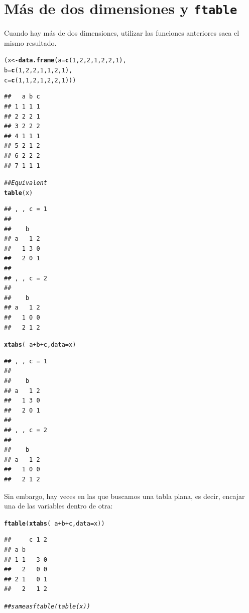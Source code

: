 \documentclass{config/apuntes}\usepackage[]{graphicx}\usepackage[]{xcolor}
\makeatletter
\newcommand{\hlnum}[1]{\textcolor[rgb]{0.686,0.059,0.569}{#1}}%
\newcommand{\hlcom}[1]{\textcolor[rgb]{0.678,0.584,0.686}{\textit{#1}}}%
\newcommand{\hlopt}[1]{\textcolor[rgb]{0,0,0}{#1}}%
\newcommand{\hldef}[1]{\textcolor[rgb]{0.345,0.345,0.345}{#1}}%
\newcommand{\hlkwb}[1]{\textcolor[rgb]{0.69,0.353,0.396}{#1}}%
\newcommand{\hlkwc}[1]{\textcolor[rgb]{0.333,0.667,0.333}{#1}}%
\newcommand{\hlkwd}[1]{\textcolor[rgb]{0.737,0.353,0.396}{\textbf{#1}}}%
\newenvironment{kframe}{%
 \def\at@end@of@kframe{}%
 \ifinner\ifhmode%
  \def\at@end@of@kframe{\end{minipage}}%
  \begin{minipage}{\columnwidth}%
 \fi\fi%
 \def\FrameCommand##1{\hskip\@totalleftmargin \hskip-\fboxsep
 \colorbox{shadecolor}{##1}\hskip-\fboxsep
     \hskip-\linewidth \hskip-\@totalleftmargin \hskip\columnwidth}%
 \MakeFramed {\advance\hsize-\width
   \@totalleftmargin\z@ \linewidth\hsize
   \@setminipage}}%
 {\par\unskip\endMakeFramed%
 \at@end@of@kframe}
\newenvironment{knitrout}{}{} %
\newcommand{\code}[1]{\texttt{#1}}
\makeatother
\begin{document}
\section{Más de dos dimensiones y \code{ftable}}
Cuando hay más de dos dimensiones, utilizar las funciones anteriores saca el mismo resultado. 
\begin{knitrout}
\color{fgcolor}\begin{kframe}
\begin{alltt}
\hldef{(x} \hlkwb{<-}  \hlkwd{data.frame}\hldef{(}\hlkwc{a} \hldef{=} \hlkwd{c}\hldef{(}\hlnum{1}\hldef{,}\hlnum{2}\hldef{,}\hlnum{2}\hldef{,}\hlnum{1}\hldef{,}\hlnum{2}\hldef{,}\hlnum{2}\hldef{,}\hlnum{1}\hldef{),}
                 \hlkwc{b} \hldef{=} \hlkwd{c}\hldef{(}\hlnum{1}\hldef{,}\hlnum{2}\hldef{,}\hlnum{2}\hldef{,}\hlnum{1}\hldef{,}\hlnum{1}\hldef{,}\hlnum{2}\hldef{,}\hlnum{1}\hldef{),}
                 \hlkwc{c} \hldef{=} \hlkwd{c}\hldef{(}\hlnum{1}\hldef{,}\hlnum{1}\hldef{,}\hlnum{2}\hldef{,}\hlnum{1}\hldef{,}\hlnum{2}\hldef{,}\hlnum{2}\hldef{,}\hlnum{1}\hldef{)))}
\end{alltt}
\begin{verbatim}
##   a b c
## 1 1 1 1
## 2 2 2 1
## 3 2 2 2
## 4 1 1 1
## 5 2 1 2
## 6 2 2 2
## 7 1 1 1
\end{verbatim}
\begin{alltt}
\hlcom{## Equivalent}
\hlkwd{table}\hldef{(x)}
\end{alltt}
\begin{verbatim}
## , , c = 1
## 
##    b
## a   1 2
##   1 3 0
##   2 0 1
## 
## , , c = 2
## 
##    b
## a   1 2
##   1 0 0
##   2 1 2
\end{verbatim}
\begin{alltt}
\hlkwd{xtabs}\hldef{(}\hlopt{~} \hldef{a} \hlopt{+} \hldef{b} \hlopt{+} \hldef{c,} \hlkwc{data} \hldef{= x)}
\end{alltt}
\begin{verbatim}
## , , c = 1
## 
##    b
## a   1 2
##   1 3 0
##   2 0 1
## 
## , , c = 2
## 
##    b
## a   1 2
##   1 0 0
##   2 1 2
\end{verbatim}
\end{kframe}
\end{knitrout}

Sin embargo, hay veces en las que buscamos una tabla plana, es decir, encajar una de las variables dentro de otra:
\begin{knitrout}
\color{fgcolor}\begin{kframe}
\begin{alltt}
\hlkwd{ftable}\hldef{(}\hlkwd{xtabs}\hldef{(}\hlopt{~} \hldef{a} \hlopt{+} \hldef{b} \hlopt{+} \hldef{c,} \hlkwc{data} \hldef{= x))}
\end{alltt}
\begin{verbatim}
##     c 1 2
## a b      
## 1 1   3 0
##   2   0 0
## 2 1   0 1
##   2   1 2
\end{verbatim}
\begin{alltt}
\hlcom{## same as ftable(table(x))}
\end{alltt}
\end{kframe}
\end{knitrout}
\end{document}
